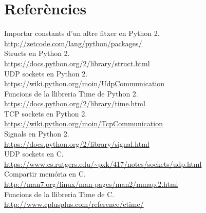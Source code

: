 \documentclass[11pt]{article}
\begin{document}
\section{Referències}
Importar constants d'un altre fitxer en Python 2.\\
\url{http://zetcode.com/lang/python/packages/}\\
Structs en Python 2.\\
\url{https://docs.python.org/2/library/struct.html}\\
UDP sockets en Python 2.\\
\url{https://wiki.python.org/moin/UdpCommunication}\\
Funcions de la llibreria Time de Python 2.\\	
\url{https://docs.python.org/2/library/time.html}\\
TCP sockets en Python 2.\\
\url{https://wiki.python.org/moin/TcpCommunication}\\
Signals en Python 2.\\	
\url{https://docs.python.org/2/library/signal.html}\\
UDP sockets en C.\\
\url{https://www.cs.rutgers.edu/~pxk/417/notes/sockets/udp.html}\\
Compartir memória en C.\\
\url{http://man7.org/linux/man-pages/man2/mmap.2.html}\\
Funcions de la llibreria Time de C.\\
\url{http://www.cplusplus.com/reference/ctime/}
\end{document}
